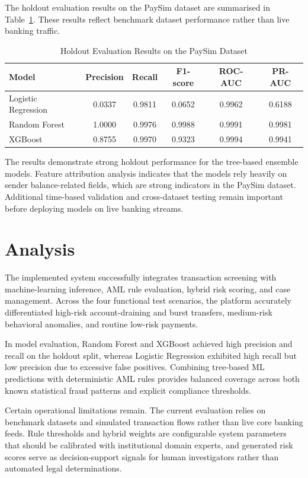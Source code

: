 \documentclass{tietreport}
\begin{document}
The holdout evaluation results on the PaySim dataset are summarised in
Table~\ref{tab:modelmetrics}. These results reflect benchmark dataset
performance rather than live banking traffic.

\begin{table}[htbp]
  \centering
  \small
  \begin{tabular}{lccccc}
    \hline
    \textbf{Model} & \textbf{Precision} & \textbf{Recall} &
    \textbf{F1-score} & \textbf{ROC-AUC} & \textbf{PR-AUC} \\
    \hline
    Logistic Regression & 0.0337 & 0.9811 & 0.0652 & 0.9962 & 0.6188 \\
    Random Forest       & 1.0000 & 0.9976 & 0.9988 & 0.9991 & 0.9981 \\
    XGBoost             & 0.8755 & 0.9970 & 0.9323 & 0.9994 & 0.9941 \\
    \hline
  \end{tabular}
  \caption{Holdout Evaluation Results on the PaySim Dataset}
  \label{tab:modelmetrics}
\end{table}

The results demonstrate strong holdout performance for the tree-based
ensemble models. Feature attribution analysis indicates that the models
rely heavily on sender balance-related fields, which are strong indicators
in the PaySim dataset. Additional time-based validation and cross-dataset
testing remain important before deploying models on live banking streams.

\section{Analysis}

The implemented system successfully integrates transaction screening with
machine-learning inference, AML rule evaluation, hybrid risk scoring, and
case management. Across the four functional test scenarios, the platform
accurately differentiated high-risk account-draining and burst transfers,
medium-risk behavioral anomalies, and routine low-risk payments.

In model evaluation, Random Forest and XGBoost achieved high precision
and recall on the holdout split, whereas Logistic Regression exhibited
high recall but low precision due to excessive false positives. Combining
tree-based ML predictions with deterministic AML rules provides balanced
coverage across both known statistical fraud patterns and explicit
compliance thresholds.

Certain operational limitations remain. The current evaluation relies on
benchmark datasets and simulated transaction flows rather than live core
banking feeds. Rule thresholds and hybrid weights are configurable system
parameters that should be calibrated with institutional domain experts,
and generated risk scores serve as decision-support signals for human
investigators rather than automated legal determinations.
\end{document}
